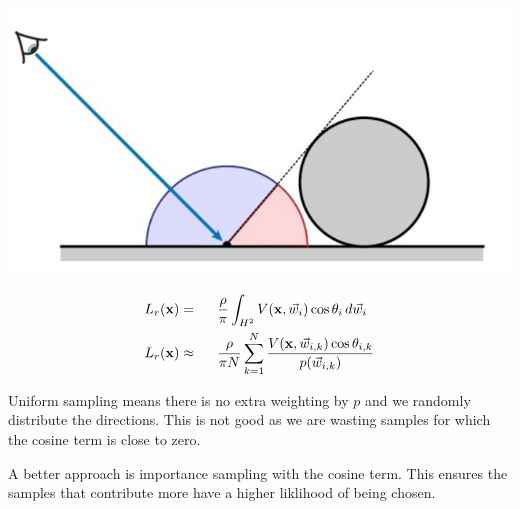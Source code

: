 \documentclass{article}
\begin{document}
\begin{minipage}{0.6\textwidth}
    \centering
    \includegraphics[width=0.8\linewidth]{images/ambient_occlusion.png}
\end{minipage}
\begin{minipage}{0.35\textwidth}
    \begin{alignat*}{2}
        &L_r(\text{\textbf{x}}) =&& \ \  \frac{\rho}{\pi} \int_{H^2} V(\text{\textbf{x}}, \vec{w}_i) \cos \theta_i \, d \vec{w}_i\\
        &L_r(\text{\textbf{x}}) \approx&& \ \ \frac{\rho}{\pi N} \sum_{k=1}^N \frac{V(\text{\textbf{x}}, \vec{w}_{i,k}) \cos \theta_{i,k}}{p(\vec{w}_{i,k})}
    \end{alignat*}
\end{minipage}

\vspace{20px}

Uniform sampling means there is no extra weighting by \(p\) and we randomly distribute the directions. This is not good as we are wasting
samples for which the cosine term is close to zero.

\vspace{5px}

A better approach is importance sampling with the cosine term. This ensures the samples that contribute more have a higher liklihood of being
chosen.

\vspace{20px}
\end{document}
